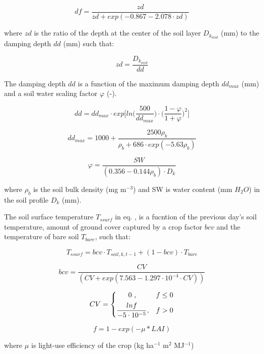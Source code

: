 \documentclass[]{article}
\begin{document}
\begin{equation}
df = \frac{zd}{zd+exp(-0.867-2.078 \cdot zd)}
\label{eq:df} 
\end{equation}

where \(zd\) is the ratio of the depth at the center of the soil layer
\(D_{k_{mid}}\) (mm) to the damping depth \(dd\) (mm) such that:

\begin{equation}
zd = \frac{D_{k_{mid}}}{dd}
\label{eq:zd} 
\end{equation}

The damping depth \(dd\) is a function of the maximum damping depth
\(dd_{max}\) (mm) and a soil water scaling factor \(\varphi\) (-).

\begin{equation}
dd = dd_{max} \cdot exp \Big[ln\Big(\frac{500}{dd_{max}} \Big) \cdot \Big(\frac{1-\varphi}{1+\varphi}\Big)^2\Big]
\label{eq:dd} 
\end{equation}

\begin{equation} 
dd_{max} = 1000 + \frac{2500\rho_b}{\rho_b+686 \cdot exp(-5.63\rho_b)}
\label{eq:ddmax} 
\end{equation}

\begin{equation} 
\varphi = \frac{SW}{(0.356-0.144\rho_b) \cdot D_{k}}
\label{eq:varphi} 
\end{equation}

where \(\rho_b\) is the soil bulk density (mg m\(^{-3}\)) and SW is
water content (mm \(H_2O\)) in the soil profile \(D_k\) (mm).

The soil surface temperature \(T_{ssurf}\) in eq. , is a
fucntion of the previous day's soil temperature, amount of ground cover
captured by a crop factor \(bcv\) and the temperature of bare soil
\(T_{bare}\), such that:

\begin{equation} 
T_{ssurf} = bcv \cdot  T_{soil, k, t-1} + (1-bcv) \cdot T_{bare}
\label{eq:Tssurf} 
\end{equation}

\begin{equation} 
bcv = \frac{CV}{(CV+exp(7.563-1.297 \cdot 10^{-4} \cdot CV))}
\label{eq:Tssurf} 
\end{equation}

\begin{equation} 
    CV = 
\begin{dcases}
     ~~~~~0~,                                     & f \leq 0 \\
    \frac{lnf}{-5\cdot10^{-5}},              & f > 0 
\end{dcases}
\end{equation}

\begin{equation} 
f=1-exp(-\mu*LAI)
\label{eq:f} 
\end{equation}

where \(\mu\) is light-use efficiency of the crop (kg ha\(^{-1}\)
m\(^2\) MJ\(^{-1}\))

\renewcommand\refname{References}

\end{document}
